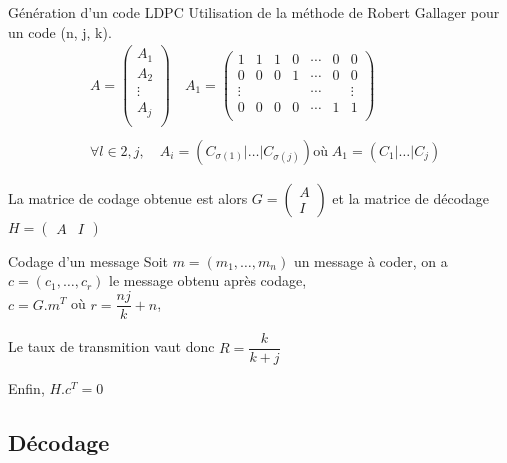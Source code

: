 \documentclass[11pt]{beamer}
\begin{document}
\begin{frame}{G\'en\'eration d'un code LDPC}
	Utilisation de la m\'ethode de Robert Gallager pour un code (n, j, k).
	\begin{equation*}
	\begin{split}
	& A =
	\begin{pmatrix}
	A_1 \\
	A_2 \\
	\vdots \\
	A_j	\\ \end{pmatrix} \quad
	A_1 =
	\begin{pmatrix}
	1 & 1 & 1 & 0 & \cdots & 0 & 0 \\
	0 & 0 & 0 & 1 & \cdots & 0 & 0 \\
	\vdots & & & & \cdots & & \vdots \\ 
	0 & 0 & 0 & 0 & \cdots & 1 & 1 \\ \end{pmatrix}\\ & \\
	& \forall l \in {2, j}, \quad A_i = \left(C_{\sigma(1)}|\ldots|C_{\sigma(j)}\right) \text{o\`u} \; A_1 = \left(C_1|\ldots|C_j\right)
	\end{split}
	\end{equation*}

	La matrice de codage obtenue est alors $G = \begin{pmatrix} A \\ I \end{pmatrix}$ et la matrice de d\'ecodage $H = \begin{pmatrix} A & I \end{pmatrix}$
\end{frame}

\begin{frame}{Codage d'un message}
	Soit $m = (m_1, \ldots, m_n)$  un message \`a coder, on a $c = (c_1,\ldots,c_r)$ le message obtenu apr\`es codage,\\
	$c = G.m^T$  o\`u $r = \dfrac{nj}{k} + n$,

	Le taux de transmition vaut donc $R = \dfrac{k}{k + j}$

	Enfin, $H.c^T = 0$
\end{frame}


\subsection{D\'ecodage}
\end{document}
